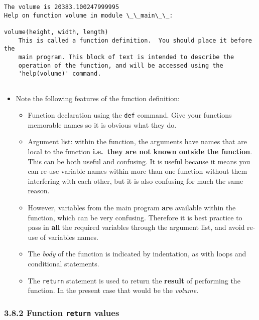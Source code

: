 \documentclass[10pt]{article}
\providecommand{\tightlist}{%
      \setlength{\itemsep}{0pt}\setlength{\parskip}{0pt}}
\begin{document}
    \begin{Verbatim}[commandchars=\\\{\}]
The volume is 20383.100247999995
Help on function volume in module \_\_main\_\_:

volume(height, width, length)
    This is called a function definition.  You should place it before the 
    main program. This block of text is intended to describe the 
    operation of the function, and will be accessed using the 
    'help(volume)' command.


    \end{Verbatim}

    \begin{itemize}
\tightlist
\item
  Note the following features of the function definition:

  \begin{itemize}
  \tightlist
  \item
    Function declaration using the \texttt{def} command. Give your
    functions memorable names so it is obvious what they do.
  \item
    Argument list: within the function, the arguments have names that
    are local to the function \textbf{i.e.~they are not known outside
    the function}. This can be both useful and confusing. It is useful
    because it means you can re-use variable names within more than one
    function without them interfering with each other, but it is also
    confusing for much the same reason.
  \item
    However, variables from the main program \textbf{are} available
    within the function, which can be very confusing. Therefore it is
    best practice to pass in \textbf{all} the required variables through
    the argument list, and avoid re-use of variables names.
  \item
    The \emph{body} of the function is indicated by indentation, as with
    loops and conditional statements.
  \item
    The \texttt{return} statement is used to return the \textbf{result}
    of performing the function. In the present case that would be the
    \emph{volume}.
  \end{itemize}
\end{itemize}

    \hypertarget{function-return-values}{%
\subsubsection*{\texorpdfstring{3.8.2 Function \texttt{return}
values}{3.8.2 Function return values}}\label{function-return-values}}
\end{document}
